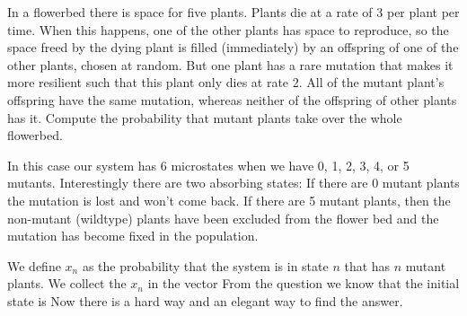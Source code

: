 In a flowerbed there is space for five plants. Plants die at a rate of 3 per plant per time. When this happens, one of the other plants has space to reproduce, so the space freed by the dying plant is filled (immediately) by an offspring of one of the other plants, chosen at random. But one plant has a rare mutation that makes it more resilient such that this plant only dies at rate 2. All of the mutant plant's offspring have the same mutation, whereas neither of the offspring of other plants has it. Compute the probability that mutant plants take over the whole flowerbed.    

\solution 
In this case our system has 6 microstates when we have 0, 1, 2, 3, 4, or 5 mutants. Interestingly there are two absorbing states: If there are 0 mutant plants the mutation is lost and won't come back. If there are 5 mutant plants, then the non-mutant (wildtype) plants have been excluded from the flower bed and the mutation has become fixed in the population. 

We define $x_n$ as the probability that the system is in state $n$ that has $n$ mutant plants. We collect the $x_n$ in the vector 
From the question we know that the initial state is 
Now there is a hard way and an elegant way to find the answer.

